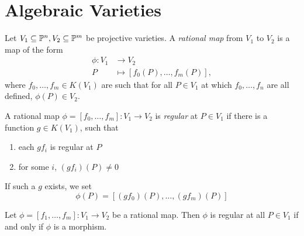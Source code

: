 \section{Algebraic Varieties}

\begin{definition}
	Let $V_1 \subseteq \mathbb{P}^n, V_2 \subseteq \mathbb{P}^m$ be projective varieties.
	A \emph{rational map} from $V_1$ to $V_2$ is a map of the form
	\begin{align*}
		\phi: V_1 &\to V_2\\
		P &\mapsto [f_0(P), \dots, f_m(P)],
	\end{align*}
	where $f_0, \dots, f_m \in K(V_1)$ are such that
	for all $P \in V_1$ at which $f_0, \dots, f_n$ are all defined, 
	$\phi(P) \in V_2$.
\end{definition}

\begin{definition}
	A rational map $\phi = [f_0, \dots, f_m]: V_1 \to V_2$
	is \emph{regular} at $P \in V_1$ if there is a function $g \in K(V_1)$,
	such that
	\begin{enumerate}[label=(\roman*)]
		\item each $gf_i$ is regular at $P$
		\item for some $i$, $(gf_i)(P) \neq 0$
	\end{enumerate}
	If such a $g$ exists, we set
	\begin{equation*}
		\phi(P) = [(gf_0)(P), \dots, (gf_m)(P)]
	\end{equation*}
\end{definition}

\begin{proposition}
	Let $\phi = [f_1, \dots, f_m]: V_1 \to V_2$ be a rational map. Then
	$\phi$ is regular at all $P \in V_1$ if and only if
	$\phi$ is a morphism.
\end{proposition}

